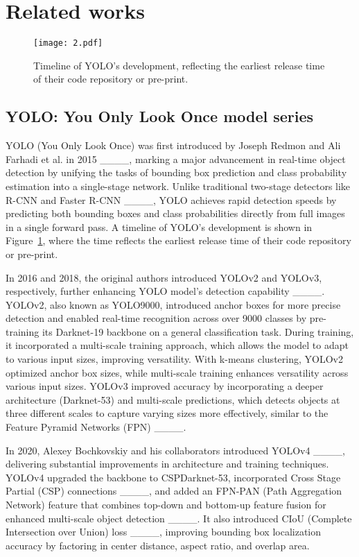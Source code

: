 \section{Related works}
\begin{figure}[H]
\centering
\texttt{[image: 2.pdf]} %
\caption{Timeline of YOLO's development, reflecting the earliest release time of their code repository or pre-print.}
\label{fig:timeline}
\end{figure}

\subsection{YOLO: You Only Look Once model series }
YOLO (You Only Look Once) was first introduced by Joseph Redmon and Ali Farhadi et al. in 2015 ____, marking a major advancement in real-time object detection by unifying the tasks of bounding box prediction and class probability estimation into a single-stage network. Unlike traditional two-stage detectors like R-CNN and Faster R-CNN ____, YOLO achieves rapid detection speeds by predicting both bounding boxes and class probabilities directly from full images in a single forward pass. A timeline of YOLO's development is shown in Figure~\ref{fig:timeline}, where the time reflects the earliest release time of their code repository or pre-print.

In 2016 and 2018, the original authors introduced YOLOv2 and YOLOv3, respectively, further enhancing YOLO model’s detection capability ____. YOLOv2, also known as YOLO9000, introduced anchor boxes for more precise detection and enabled real-time recognition across over 9000 classes by pre-training its Darknet-19 backbone on a general classification task. During training, it incorporated a multi-scale training approach, which allows the model to adapt to various input sizes, improving versatility. With k-means clustering, YOLOv2 optimized anchor box sizes, while multi-scale training enhances versatility across various input sizes. YOLOv3 improved accuracy by incorporating a deeper architecture (Darknet-53) and multi-scale predictions, which detects objects at three different scales to capture varying sizes more effectively, similar to the Feature Pyramid Networks (FPN) ____.

In 2020, Alexey Bochkovskiy and his collaborators introduced YOLOv4 ____, delivering substantial improvements in architecture and training techniques. YOLOv4 upgraded the backbone to CSPDarknet-53, incorporated Cross Stage Partial (CSP) connections ____, and added an FPN-PAN (Path Aggregation Network) feature that combines top-down and bottom-up feature fusion for enhanced multi-scale object detection ____. It also introduced CIoU (Complete Intersection over Union) loss ____, improving bounding box localization accuracy by factoring in center distance, aspect ratio, and overlap area.

